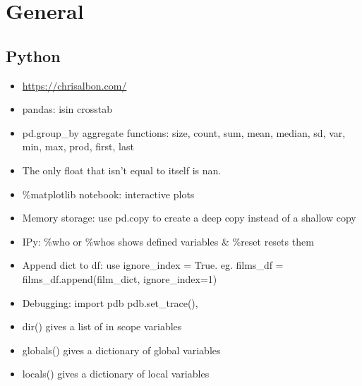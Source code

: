 \documentclass[]{book}
\newenvironment{Shaded}{\begin{snugshade}}{\end{snugshade}}
\newcommand{\KeywordTok}[1]{\textcolor[rgb]{0.13,0.29,0.53}{\textbf{#1}}}
\newcommand{\StringTok}[1]{\textcolor[rgb]{0.31,0.60,0.02}{#1}}
\newcommand{\CommentTok}[1]{\textcolor[rgb]{0.56,0.35,0.01}{\textit{#1}}}
\newcommand{\OperatorTok}[1]{\textcolor[rgb]{0.81,0.36,0.00}{\textbf{#1}}}
\newcommand{\NormalTok}[1]{#1}
\theoremstyle{definition}
\theoremstyle{definition}
\theoremstyle{definition}
\theoremstyle{remark}
\begin{document}
\begin{Shaded}
\end{Shaded}

\begin{Shaded}
\end{Shaded}

\chapter*{General}\label{general-2}

\section{Python}\label{python-1}

\begin{itemize}
\item
  \url{https://chrisalbon.com/}
\item
  pandas: isin \textbar{} crosstab
\item
  pd.group\_by aggregate functions: size, count, sum, mean, median, sd,
  var, min, max, prod, first, last
\item
  The only float that isn't equal to itself is nan.
\item
  \%matplotlib notebook: interactive plots
\item
  Memory storage: use pd.copy to create a deep copy instead of a shallow
  copy
\item
  IPy: \%who or \%whos shows defined variables \& \%reset resets them
\item
  Append dict to df: use ignore\_index = True. eg. films\_df =
  films\_df.append(film\_dict, ignore\_index=1)
\item
  Debugging: import pdb \textbar{} pdb.set\_trace(),
\item
  dir() gives a list of in scope variables
\item
  globals() gives a dictionary of global variables
\item
  locals() gives a dictionary of local variables
\end{itemize}
\end{document}
